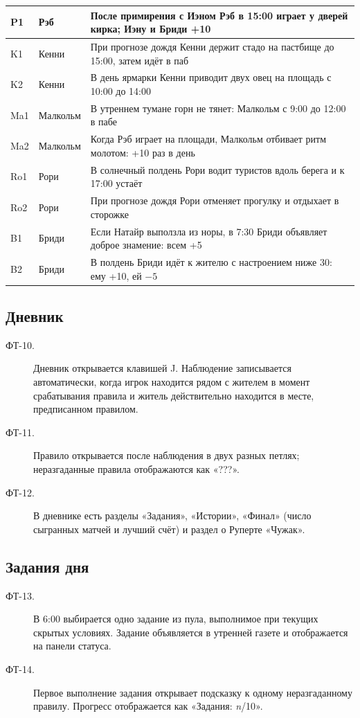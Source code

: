 \documentclass[12pt]{article}
\begin{document}
{\begin{longtable}{|p{12mm}|p{24mm}|p{118mm}|}
P1 & Рэб & После примирения с Иэном Рэб в 15:00 играет у дверей кирка; Иэну и Бриди +10\\\hline
K1 & Кенни & При прогнозе дождя Кенни держит стадо на пастбище до 15:00, затем идёт в паб\\\hline
K2 & Кенни & В день ярмарки Кенни приводит двух овец на площадь с 10:00 до 14:00\\\hline
Ma1 & Малкольм & В утреннем тумане горн не тянет: Малкольм с 9:00 до 12:00 в пабе\\\hline
Ma2 & Малкольм & Когда Рэб играет на площади, Малкольм отбивает ритм молотом: +10 раз в день\\\hline
Ro1 & Рори & В солнечный полдень Рори водит туристов вдоль берега и к 17:00 устаёт\\\hline
Ro2 & Рори & При прогнозе дождя Рори отменяет прогулку и отдыхает в сторожке\\\hline
B1 & Бриди & Если Натайр выползла из норы, в 7:30 Бриди объявляет доброе знамение: всем +5\\\hline
B2 & Бриди & В полдень Бриди идёт к жителю с настроением ниже 30: ему +10, ей $-5$\\\hline
\end{longtable}}

\subsection{Дневник}
\begin{description}
\item[ФТ-10.] Дневник открывается клавишей J. Наблюдение записывается автоматически, когда игрок находится рядом с жителем в момент срабатывания правила и житель действительно находится в месте, предписанном правилом.
\item[ФТ-11.] Правило открывается после наблюдения в двух разных петлях; неразгаданные правила отображаются как «???».
\item[ФТ-12.] В дневнике есть разделы «Задания», «Истории», «Финал» (число сыгранных матчей и лучший счёт) и раздел о Руперте «Чужак».
\end{description}

\subsection{Задания дня}
\begin{description}
\item[ФТ-13.] В 6:00 выбирается одно задание из пула, выполнимое при текущих скрытых условиях. Задание объявляется в утренней газете и отображается на панели статуса.
\item[ФТ-14.] Первое выполнение задания открывает подсказку к одному неразгаданному правилу. Прогресс отображается как «Задания: \textit{n}/10».
\end{description}
\end{document}
